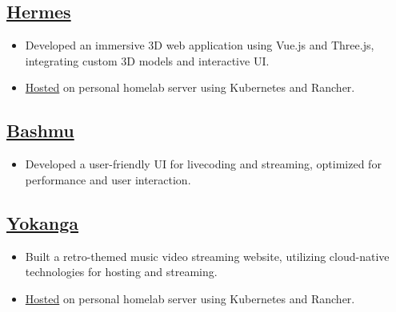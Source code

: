\documentclass[a4paper,10pt]{article}
\begin{document}
\subsection*{\href{https://github.com/jordojordo/hermes}{Hermes}}
\begin{itemize}[leftmargin=1.5em]
    \item Developed an immersive 3D web application using Vue.js and Three.js, integrating custom 3D models and interactive UI.
    \item \href{https://hermes.yokanga.xyz}{Hosted} on personal homelab server using Kubernetes and Rancher.
\end{itemize}

\subsection*{\href{https://github.com/jordojordo/bashmu}{Bashmu}}
\begin{itemize}[leftmargin=1.5em]
    \item Developed a user-friendly UI for livecoding and streaming, optimized for performance and user interaction.
\end{itemize}

\subsection*{\href{https://github.com/jordojordo/yokanga.xyz}{Yokanga}}
\begin{itemize}[leftmargin=1.5em]
    \item Built a retro-themed music video streaming website, utilizing cloud-native technologies for hosting and streaming.
    \item \href{https://yokanga.xyz}{Hosted} on personal homelab server using Kubernetes and Rancher.
\end{itemize}
\end{document}
